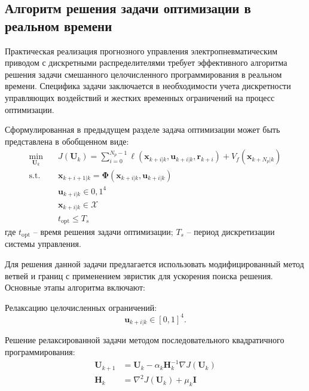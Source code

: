 \subsection{Алгоритм решения задачи оптимизации в реальном времени}\label{subsec:ch3/sec5/sub4}

Практическая реализация прогнозного управления электропневматическим
приводом с дискретными распределителями требует эффективного алгоритма
решения задачи смешанного целочисленного программирования в реальном времени.
Специфика задачи заключается в необходимости учета дискретности управляющих воздействий и
жестких временных ограничений на процесс оптимизации.

Сформулированная в предыдущем разделе задача оптимизации может быть представлена в обобщенном виде:
\begin{equation}
\begin{aligned}
\min_{\mathbf{U}_k} \quad & J(\mathbf{U}_k) = \sum_{i=0}^{N_p-1} \ell(\mathbf{x}_{k+i|k}, \mathbf{u}_{k+i|k}, \mathbf{r}_{k+i}) + V_f(\mathbf{x}_{k+N_p|k}) \\
\text{s.t.} \quad & \mathbf{x}_{k+i+1|k} = \boldsymbol{\Phi}(\mathbf{x}_{k+i|k}, \mathbf{u}_{k+i|k}) \\
& \mathbf{u}_{k+i|k} \in {0,1}^4 \\
& \mathbf{x}_{k+i|k} \in \mathcal{X} \\
& t_{\text{opt}} \leq T_s
\end{aligned}
\end{equation}
где $t_{\text{opt}}$ -- время решения задачи оптимизации;
$T_s$ -- период дискретизации системы управления.

Для решения данной задачи предлагается использовать модифицированный метод ветвей
и границ с применением эвристик для ускорения поиска решения. Основные этапы алгоритма включают:

Релаксацию целочисленных ограничений:
\begin{equation*}
\mathbf{u}_{k+i|k} \in [0,1]^4.
\end{equation*}

Решение релаксированной задачи методом последовательного квадратичного программирования:
\begin{equation*}
\begin{aligned}
\mathbf{U}_{k+1} &= \mathbf{U}_k - \alpha_k \mathbf{H}_k^{-1}\nabla J(\mathbf{U}_k) \\
\mathbf{H}_k &= \nabla^2 J(\mathbf{U}_k) + \mu_k\mathbf{I}
\end{aligned}
\end{equation*}

